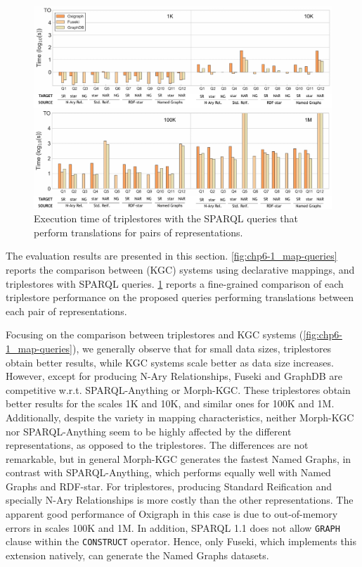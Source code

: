 \begin{figure}[t!]
    \centering
    \includegraphics[width=\linewidth]{figures/chp6-1_results-queries.pdf}
    \caption[Execution times of KG re-construction in triplestores]{Execution time of triplestores with the SPARQL queries that perform translations for pairs of representations.}
    \label{fig:chp6-1_queries}
\end{figure}

The evaluation results are presented in this section. \cref{fig:chp6-1_map-queries} reports the comparison between (KGC) systems using declarative mappings, and triplestores with SPARQL queries. 
\cref{fig:chp6-1_queries} reports a fine-grained comparison of each triplestore performance on the proposed queries performing translations between each pair of representations.

Focusing on the comparison between triplestores and KGC systems (\cref{fig:chp6-1_map-queries}), we generally observe that for small data sizes, triplestores obtain better results, while KGC systems scale better as data size increases. 
However, except for producing N-Ary Relationships, Fuseki and GraphDB are competitive w.r.t. SPARQL-Anything or Morph-KGC. These triplestores obtain better results for the scales 1K and 10K, and similar ones for 100K and 1M. 
Additionally, despite the variety in mapping characteristics, neither Morph-KGC nor SPARQL-Anything seem to be highly affected by the different representations, as opposed to the triplestores. 
The differences are not remarkable, but in general Morph-KGC generates the fastest Named Graphs, in contrast with SPARQL-Anything, which performs equally well with Named Graphs and RDF-star. 
For triplestores, producing Standard Reification and specially N-Ary Relationships is more costly than the other representations. The apparent good performance of Oxigraph in this case is due to out-of-memory errors in scales 100K and 1M.
In addition, SPARQL 1.1 does not allow \texttt{GRAPH} clause within the \texttt{CONSTRUCT} operator. Hence, only Fuseki, which implements this extension natively, can generate the Named Graphs datasets.

